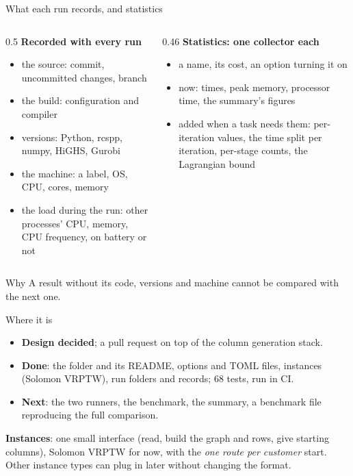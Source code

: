 \documentclass[aspectratio=169]{beamer}
\begin{document}
\begin{frame}{What each run records, and statistics}
  \begin{columns}[T]
    \begin{column}{0.5\textwidth}
      \textbf{Recorded with every run}
      \begin{itemize}\small
        \item the source: commit, uncommitted changes, branch
        \item the build: configuration and compiler
        \item versions: Python, rcspp, numpy, HiGHS, Gurobi
        \item the machine: a label, OS, CPU, cores, memory
        \item the load during the run: other processes' CPU, memory, CPU frequency, on battery or not
      \end{itemize}
    \end{column}
    \begin{column}{0.46\textwidth}
      \textbf{Statistics: one collector each}
      \begin{itemize}\small
        \item a name, its cost, an option turning it on
        \item now: times, peak memory, processor time, the summary's figures
        \item added when a task needs them: per-iteration values, the time split per iteration, per-stage counts,
          the Lagrangian bound
      \end{itemize}
    \end{column}
  \end{columns}

  \vspace{0.6em}
  \begin{block}{Why}
    \small A result without its code, versions and machine cannot be compared with the next one.
  \end{block}
\end{frame}

\begin{frame}{Where it is}
  \begin{itemize}
    \item \textbf{Design decided}; a pull request on top of the column generation stack.
    \item \textbf{Done}: the folder and its README, options and TOML files, instances (Solomon VRPTW), run folders
      and records; 68 tests, run in CI.
    \item \textbf{Next}: the two runners, the benchmark, the summary, a benchmark file reproducing the full
      comparison.
  \end{itemize}

  \vspace{0.6em}
  \textbf{Instances}: one small interface (read, build the graph and rows, give starting columns),
  Solomon VRPTW for now, with the \emph{one route per customer} start. Other instance types can plug in later
  without changing the format.
\end{frame}
\end{document}
